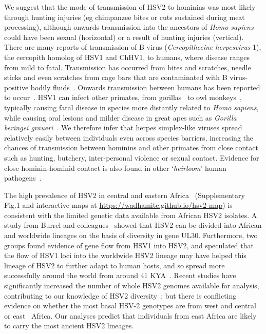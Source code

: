 \documentclass[fleqn,10pt]{wlscirep}
\begin{document}
We suggest that the mode of transmission of HSV2 to hominins was most likely through hunting injuries (eg chimpanzee bites or cuts sustained during meat processing), although onwards transmission into the ancestors of \textit{Homo sapiens} could have been sexual (horizontal) or a result of hunting injuries (vertical). There are many reports of transmission of B virus (\textit{Cercopithecine herpesvirus} 1), the cercopith homolog of HSV1 and ChHV1, to humans, where disease ranges from mild to fatal. Transmission has occurred from bites and scratches, needle sticks and even scratches from cage bars that are contaminated with B virus-positive bodily fluids~\citep{Huff2003}. Onwards transmission between humans has been reported to occur~\citep{CDC1987}. HSV1 can infect other primates, from gorillas~\citep{Gilardi2014} to owl monkeys~\citep{Melendez1969}, typically causing fatal disease in species more distantly related to \textit{Homo sapiens}, while causing oral lesions and milder disease in great apes such as \textit{Gorilla beringei graueri}~\citep{Gilardi2014}. We therefore infer that herpes simplex-like viruses spread relatively easily between individuals even across species barriers, increasing the chances of transmission between hominins and other primates from close contact such as hunting, butchery, inter-personal violence or sexual contact. Evidence for close hominin-hominid contact is also found in other `\textit{heirloom}' human pathogens~\citep{Houldcroft2017a}.

The high prevalence of HSV2 in central and eastern Africa~\citep{Looker2015} (Supplementary Fig.1 and interactive maps at \url{https://wadhamite.github.io/hsv2-map}) is consistent with the limited genetic data available from African HSV2 isolates. A study from Burrel and colleagues~\citep{Burrel2015} showed that HSV2 can be divided into African and worldwide lineages on the basis of diversity in gene UL30. Furthermore, two groups found evidence of gene flow from HSV1 into HSV2, and speculated that the flow of HSV1 loci into the worldwide HSV2 lineage may have helped this lineage of HSV2 to further adapt to human hosts, and so spread more successfully around the world from around 41 KYA~\citep{Burrel2015,Koelle2017}. Recent studies have significantly increased the number of whole HSV2 genomes available for analysis, contributing to our knowledge of HSV2 diversity~\citep{Kolb2015,Szpara2014}; but there is conflicting evidence on whether the most basal HSV-2 genotypes are from west and central~\citep{Burrel2017} or east~\citep{Koelle2017} Africa. Our analyses predict that individuals from east Africa are likely to carry the most ancient HSV2 lineages. 
\end{document}
